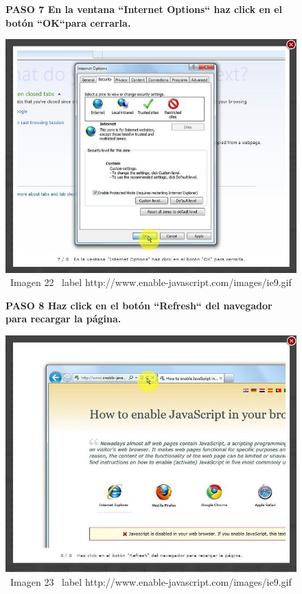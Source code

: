 \documentclass[11pt]{article} %
\begin{document}
\begin{figure}
\begin{center}

\begin{center}
\bf PASO 7
En la ventana ``Internet Options`` haz click en el botón ``OK``para cerrarla.
\end{center}
\includegraphics[height=8 cm, width=8 cm] {imagenes/explorer 07.JPG}
\newline
\newline
\ Imagen 22
\ label {http://www.enable-javascript.com/images/ie9.gif }

\begin{center}
\bf PASO 8
Haz click en el botón ``Refresh`` del navegador para recargar la página.
\end{center}

\includegraphics[height=8 cm, width=8 cm] {imagenes/explorer 08.JPG}
\newline
\newline
\ Imagen 23
\ label {http://www.enable-javascript.com/images/ie9.gif }

\end{center}
\end{figure}
\end{document}
